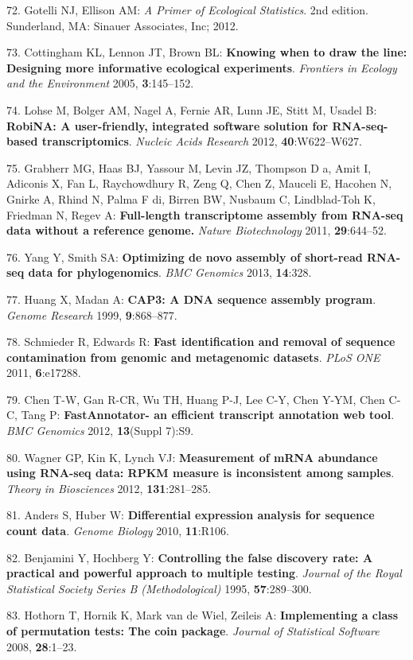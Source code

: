 \documentclass[]{article}
\begin{document}
72. Gotelli NJ, Ellison AM: \emph{A Primer of Ecological Statistics}.
2nd edition. Sunderland, MA: Sinauer Associates, Inc; 2012.

73. Cottingham KL, Lennon JT, Brown BL: \textbf{Knowing when to draw the
line: Designing more informative ecological experiments}.
\emph{Frontiers in Ecology and the Environment} 2005,
\textbf{3}:145--152.

74. Lohse M, Bolger AM, Nagel A, Fernie AR, Lunn JE, Stitt M, Usadel B:
\textbf{RobiNA: A user-friendly, integrated software solution for
RNA-seq-based transcriptomics}. \emph{Nucleic Acids Research} 2012,
\textbf{40}:W622--W627.

75. Grabherr MG, Haas BJ, Yassour M, Levin JZ, Thompson D a, Amit I,
Adiconis X, Fan L, Raychowdhury R, Zeng Q, Chen Z, Mauceli E, Hacohen N,
Gnirke A, Rhind N, Palma F di, Birren BW, Nusbaum C, Lindblad-Toh K,
Friedman N, Regev A: \textbf{Full-length transcriptome assembly from
RNA-seq data without a reference genome.} \emph{Nature Biotechnology}
2011, \textbf{29}:644--52.

76. Yang Y, Smith SA: \textbf{Optimizing de novo assembly of short-read
RNA-seq data for phylogenomics}. \emph{BMC Genomics} 2013,
\textbf{14}:328.

77. Huang X, Madan A: \textbf{CAP3: A DNA sequence assembly program}.
\emph{Genome Research} 1999, \textbf{9}:868--877.

78. Schmieder R, Edwards R: \textbf{Fast identification and removal of
sequence contamination from genomic and metagenomic datasets}.
\emph{PLoS ONE} 2011, \textbf{6}:e17288.

79. Chen T-W, Gan R-CR, Wu TH, Huang P-J, Lee C-Y, Chen Y-YM, Chen C-C,
Tang P: \textbf{FastAnnotator- an efficient transcript annotation web
tool}. \emph{BMC Genomics} 2012, \textbf{13}(Suppl 7):S9.

80. Wagner GP, Kin K, Lynch VJ: \textbf{Measurement of mRNA abundance
using RNA-seq data: RPKM measure is inconsistent among samples}.
\emph{Theory in Biosciences} 2012, \textbf{131}:281--285.

81. Anders S, Huber W: \textbf{Differential expression analysis for
sequence count data}. \emph{Genome Biology} 2010, \textbf{11}:R106.

82. Benjamini Y, Hochberg Y: \textbf{Controlling the false discovery
rate: A practical and powerful approach to multiple testing}.
\emph{Journal of the Royal Statistical Society Series B
(Methodological)} 1995, \textbf{57}:289--300.

83. Hothorn T, Hornik K, Mark van de Wiel, Zeileis A:
\textbf{Implementing a class of permutation tests: The coin package}.
\emph{Journal of Statistical Software} 2008, \textbf{28}:1--23.
\end{document}
